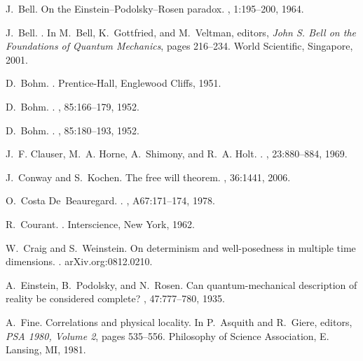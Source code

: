 \documentclass[12pt]{article}%
\begin{document}
\begin{thebibliography}{99}

J.~Bell.
\newblock On the {E}instein--{P}odolsky--{R}osen paradox.
, 1:195--200, 1964.

J.~Bell.
.
\newblock In M.~Bell, K.~Gottfried, and M.~Veltman, editors, {\em John S. Bell
  on the Foundations of Quantum Mechanics}, pages 216--234. World Scientific,
  Singapore, 2001.

D.~Bohm.
.
\newblock Prentice-Hall, Englewood Cliffs, 1951.

D.~Bohm.
.
, 85:166--179, 1952.

D.~Bohm.
.
, 85:180--193, 1952.

J.~F. Clauser, M.~A. Horne, A.~Shimony, and R.~A. Holt.
.
, 23:880--884, 1969.

J.~Conway and S.~Kochen.
\newblock The free will theorem.
, 36:1441, 2006.

O.~Costa De~Beauregard.
.
, A67:171--174, 1978.

R.~Courant.
.
\newblock Interscience, New York, 1962.

W.~Craig and S.~Weinstein.
\newblock On determinism and well-posedness in multiple time dimensions.
.
\newblock arXiv.org:0812.0210.

A.~Einstein, B.~Podolsky, and N.~Rosen.
\newblock Can quantum-mechanical description of reality be considered complete?
, 47:777--780, 1935.

A.~Fine.
\newblock Correlations and physical locality.
\newblock In P.~Asquith and R.~Giere, editors, {\em PSA 1980, Volume 2}, pages
  535--556. Philosophy of Science Association, E. Lansing, MI, 1981.


\end{thebibliography}
\end{document}
